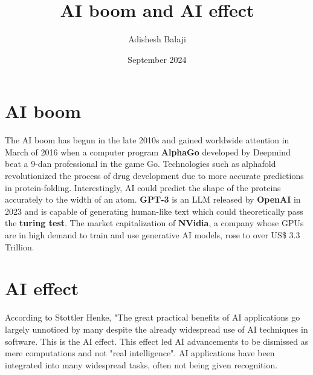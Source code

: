 \documentclass[journal,12pt,onecolumn]{IEEEtran}
\title{AI boom and AI effect}
\author{Adishesh Balaji}
\date{September 2024}
\begin{document}

\maketitle
\section{\textbf{AI boom}}
The AI boom has begun in the late 2010s and gained worldwide attention in March of 2016 when a computer program \textbf{AlphaGo} developed by Deepmind beat a 9-dan professional in the game Go. Technologies such as alphafold revolutionized the process of drug development due to more accurate predictions in protein-folding. Interestingly, AI could predict the shape of the proteins accurately to the width of an atom.
\textbf{GPT-3} is an LLM released by \textbf{OpenAI} in 2023 and is capable of generating human-like text which could theoretically pass the \textbf{turing test}. The market capitalization of \textbf{NVidia}, a company whose GPUs are in high demand to train and use generative AI models, rose to over US\$ 3.3 Trillion.
\section{\textbf{AI effect}}
According to Stottler Henke, "The great practical benefits of AI applications go largely unnoticed by many despite the already widespread use of AI techniques in software. This is the AI effect. This effect led AI advancements to be dismissed as mere computations and not "real intelligence". AI applications have been integrated into many widespread tasks, often not being given recognition. 
\end{document}

